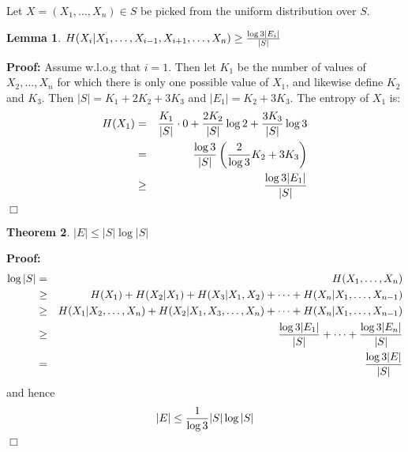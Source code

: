 \documentclass[11pt]{article} \usepackage{amssymb}
\newtheorem{theorem}{Theorem}[section]
\newtheorem{lemma}[theorem]{Lemma}
\newenvironment{proof}{\noindent \textbf{Proof:}}{$\Box$}
\begin{document}
\begin{enumerate}
Let $X=(X_1,\ldots,X_n)\in S$ be picked from the uniform distribution over
$S$.
\begin{lemma}
  $H(X_i|X_1,\ldots,X_{i-1},X_{i+1},\ldots,X_n)\geq {\log 3|E_i|\over|S|}$
\end{lemma}
\begin{proof}
Assume w.l.o.g that $i=1$. Then let $K_1$ be the number of values 
of $X_2,\ldots,X_n$ for which there is only one possible value of $X_1$,
and likewise define $K_2$ and $K_3$. Then $|S|=K_1+2K_2+3K_3$ and
 $|E_1|=K_2+3K_3$. The entropy of
$X_1$ is:
\begin{eqnarray*}
  H(X_1)&=&{K_1\over |S|}\cdot 0 +{2K_2\over|S|}\log 2 + {3K_3\over |S|}\log 3\\
&=& {\log 3\over|S|}\left({2\over \log 3}K_2+3K_3\right)\\ 
&\geq& {\log 3|E_1|\over|S|}
\end{eqnarray*}
\end{proof}
\begin{theorem}
  $|E|\leq |S|\log|S|$
\end{theorem}
\begin{proof}
  \begin{eqnarray*}
    \log|S|&=&H(X_1,\ldots,X_n)\\
    &\geq& H(X_1)+H(X_2|X_1)+H(X_3|X_1,X_2)+\cdots+H(X_n|X_1,\ldots,X_{n-1})\\
    &\geq& H(X_1|X_2,\ldots,X_n)+H(X_2|X_1,X_3,\ldots,X_n)+\cdots+H(X_n|X_1,\ldots,X_{n-1})\\
    &\geq& {\log3|E_1|\over|S|}+\cdots+{\log3|E_n|\over|S|}\\
    &=&{\log3|E|\over|S|}
  \end{eqnarray*}
and hence
\begin{equation*}
  |E|\leq{1\over \log 3}|S|\log|S|
\end{equation*}
\end{proof}

\end{enumerate}
\end{document}
